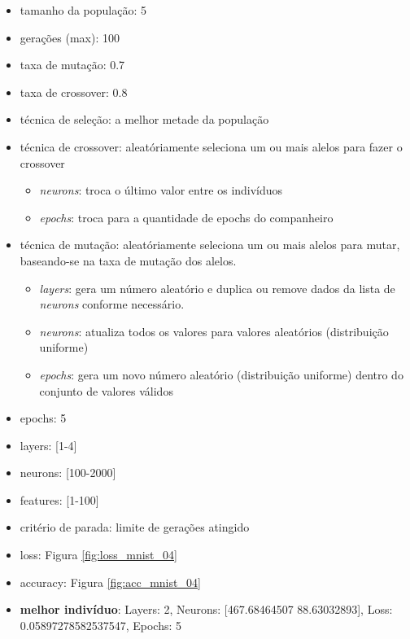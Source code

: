 \documentclass[twoside,conference,a4paper]{IEEEtran}
\begin{document}
\begin{itemize}
    \item tamanho da população: 5
    \item gerações (max): 100
    \item taxa de mutação: 0.7
    \item taxa de crossover: 0.8
    \item técnica de seleção: a melhor metade da população
    \item técnica de crossover: aleatóriamente seleciona um ou mais alelos para fazer o crossover
    \begin{itemize}
        \item \emph{neurons}: troca o último valor entre os indivíduos
        \item \emph{epochs}: troca para a quantidade de epochs do companheiro
    \end{itemize}
    \item técnica de mutação: aleatóriamente seleciona um ou mais alelos para mutar, baseando-se na taxa de mutação dos alelos.
    \begin{itemize}
        \item \emph{layers}: gera um número aleatório e duplica ou remove dados da lista de \emph{neurons} conforme necessário.
        \item \emph{neurons}: atualiza todos os valores para valores aleatórios (distribuição uniforme)
        \item \emph{epochs}: gera um novo número aleatório (distribuição uniforme) dentro do conjunto de valores válidos
    \end{itemize}
    \item epochs: 5
    \item layers: [1-4]
    \item neurons: [100-2000]
    \item features: [1-100]
    \item critério de parada: limite de gerações atingido
    \item loss: Figura \ref{fig:loss_mnist_04}
    \item accuracy: Figura \ref{fig:acc_mnist_04}
    \item \textbf{melhor indivíduo}: Layers: 2, Neurons: [467.68464507  88.63032893], Loss: 0.05897278582537547, Epochs: 5
\end{itemize}
\end{document}
